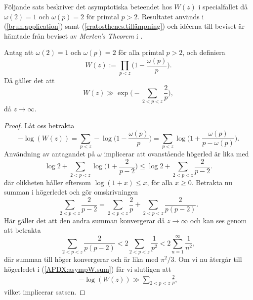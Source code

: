 Följande sats beskriver det asymptotiska beteendet hos $W(z)$ i specialfallet då $\omega(2)=1$ och $\omega(p)=2$ för primtal $p>2$. 
Resultatet används i (\ref{brun.application}) samt (\ref{eratosthenes.tillämpning}) och idéerna till beviset är hämtade från beviset av \textit{Merten's Theorem} i \cite[kap 5.2]{cojocarumurty}.

\begin{theorem} \label{APDX:asympW}
Antag att $\omega(2)=1$ och $\omega(p)=2$ för alla primtal $p>2$, och definiera 
\begin{equation*}
    W(z):=\prod_{p<z}\biggl( 1-\frac{\omega(p)}{p} \biggr).   
\end{equation*}
Då gäller det att
\begin{equation} \label{APDX:asympW.main}
    W(z) \gg \exp \biggl( - \sum_{2 <p < z} \frac{2}{p}  \biggr),
\end{equation}
då $z\to\infty$.
\end{theorem}


\begin{proof}
Låt oss betrakta
\begin{equation*}
    -\log(W(z)) 
    = \sum_{p < z} -\log\biggl( 1-\frac{\omega(p)}{p} \biggr) 
    = \sum_{p < z} \log\biggl( 1+\frac{\omega(p)}{p-\omega(p)} \biggr).
\end{equation*}
Användning av antagandet på $\omega$ implicerar att ovanstående högerled är lika med 
\begin{equation} \label{APDX:asympW.sum}
    \log 2 + \sum_{2<p<z} \log\biggl( 1+\frac{2}{p-2} \biggr)
    \leq \log 2 + \sum_{2<p<z} \frac{2}{p-2}.
\end{equation}
där olikheten håller eftersom $\log(1+x)\leq x$, för alla $x\geq0$. 
Betrakta nu summan i högerledet och gör omskrivningen
\begin{equation*}
    \sum_{2 <p < z} \frac{2}{p-2} = \sum_{2 <p < z} \frac{2}{p} + \sum_{2 <p < z} \frac{2}{p(p-2)}.
\end{equation*}
Här gäller det att den andra summan konvergerar då $z\to\infty$ och kan ses genom att betrakta
\begin{equation*}
    \sum_{2 <p < z} \frac{2}{p(p-2)} < 2\sum_{2 <p < z} \frac{1}{p^2} < 2\sum_{n = 1}^\infty \frac{1}{n^2},
\end{equation*}
där summan till höger konvergerar och är lika med $\pi^2/3$.
Om vi nu återgår till högerledet i (\ref{APDX:asympW.sum}) får vi slutligen att
\begin{align*}
    -\log(W(z)) \gg \sum_{2 <p < z} \frac{2}{p},
\end{align*}
vilket implicerar satsen.
\end{proof}